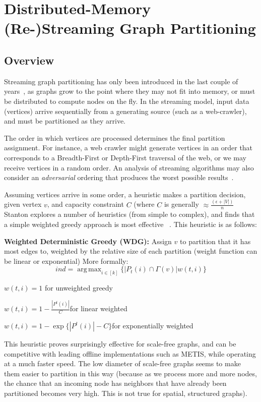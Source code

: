 \documentclass[11pt]{article}
\DeclareMathOperator*{\argmax}{arg\,max}
\begin{document}


\newpage \section{Distributed-Memory (Re-)Streaming Graph Partitioning}
\subsection{Overview}
Streaming graph partitioning has only been introduced in the last couple of years~\cite{DBLP:journals/corr/abs-1212-1121,Stanton:2012:SGP:2339530.2339722,tsourakakis2012fennel}, as graphs grow to the point where they may not fit into memory, or must be distributed to compute nodes on the fly. In the streaming model, input data (vertices) arrive sequentially from a generating source (such as a web-crawler), and must be partitioned as they arrive.

The order in which vertices are processed determines the final partition assignment. For instance, a web crawler might generate vertices in an order that corresponds to a Breadth-First or Depth-First traversal of the web, or we may receive vertices in a random order. An analysis of streaming algorithms may also consider an \textit{adversarial} ordering that produces the worst possible results~\cite{Stanton:2012:SGP:2339530.2339722}.

Assuming vertices arrive in some order, a heuristic makes a partition decision, given vertex $v$, and capacity constraint $C$ (where $C$ is generally $\approx \frac{(\epsilon+|V|)}{n}$ Stanton explores a number of heuristics (from simple to complex), and finds that a simple weighted greedy approach is most effective ~\cite{Stanton:2012:SGP:2339530.2339722}. This heuristic is as follows:

\textbf{Weighted Deterministic Greedy (WDG):} Assign $v$ to partition that it has most edges to, weighted by the relative size of each partition (weight function can be linear or exponential) More formally: 
\[ ind=\argmax_{i\in [k]}\{|P_t(i) \cap \Gamma(v) | w(t,i)\} \]

$w(t,i)=1$ for unweighted greedy

$w(t,i)=1-\frac{|P^t(i)|}{C} $for linear weighted

$w(t,i)=1-\exp\{|P^t(i)|-C\} $for exponentially weighted

This heuristic proves surprisingly effective for scale-free graphs, and can be competitive with leading offline implementations such as METIS, while operating at a much faster speed. The low diameter of scale-free graphs seems to make them easier to partition in this way (because as we process more and more nodes, the chance that an incoming node has neighbors that have already been partitioned becomes very high. This is not true for spatial, structured graphs). 
\end{document}
